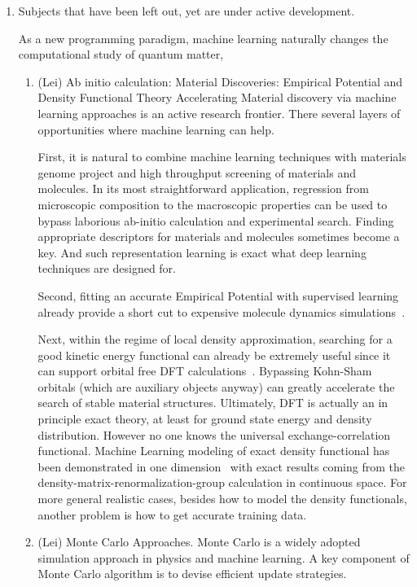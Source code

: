 \documentclass[aps,prb,floatfix,amsmath,amssymb,amsfonts,10pt,floatfix,longbibliography]{revtex4-1}
\begin{document}
\begin{enumerate}
\item Subjects that have been left out, yet are under active development. 

As a new programming paradigm, machine learning naturally changes the computational study of quantum matter, 
    \begin{enumerate}	
    
    \item (Lei) Ab initio calculation:  Material Discoveries: Empirical Potential and Density Functional Theory
	 Accelerating Material discovery via machine learning approaches is an active research frontier. There several layers of opportunities where machine learning can help. 

 First, it is natural to combine machine learning techniques with materials genome project and high throughput screening of materials and molecules. In its most straightforward application, regression from microscopic composition to the macroscopic properties can be used to bypass laborious ab-initio calculation and experimental search. Finding  appropriate descriptors for materials and molecules sometimes become a key. And such representation learning is exact what deep learning techniques are  designed for. 

 Second, fitting an accurate Empirical Potential with supervised learning already provide a short cut to expensive molecule dynamics simulations~\cite{SchNet, DeepMD}. 

 Next, within the regime of local density approximation, searching for a good kinetic energy functional can already be extremely useful since it can support orbital free DFT calculations~\cite{Snyder2012, Brockherde2017}. Bypassing Kohn-Sham orbitals (which are auxiliary objects anyway) can greatly accelerate the search of stable material structures. Ultimately, DFT is actually an in principle exact theory, at least for ground state energy and density distribution. However no one knows the universal exchange-correlation functional. Machine Learning modeling of exact density functional has been demonstrated in one dimension~\cite{Li2016} with exact results coming from the density-matrix-renormalization-group calculation in continuous space. For more general realistic cases, besides how to model the density functionals, another problem is how to get accurate training data. 	
  

	\item (Lei) Monte Carlo Approaches.  Monte Carlo is a widely adopted simulation approach in physics and machine learning. A key component of Monte Carlo algorithm is to devise efficient update strategies. 
	

\end{enumerate}
\end{enumerate}
\end{document}
